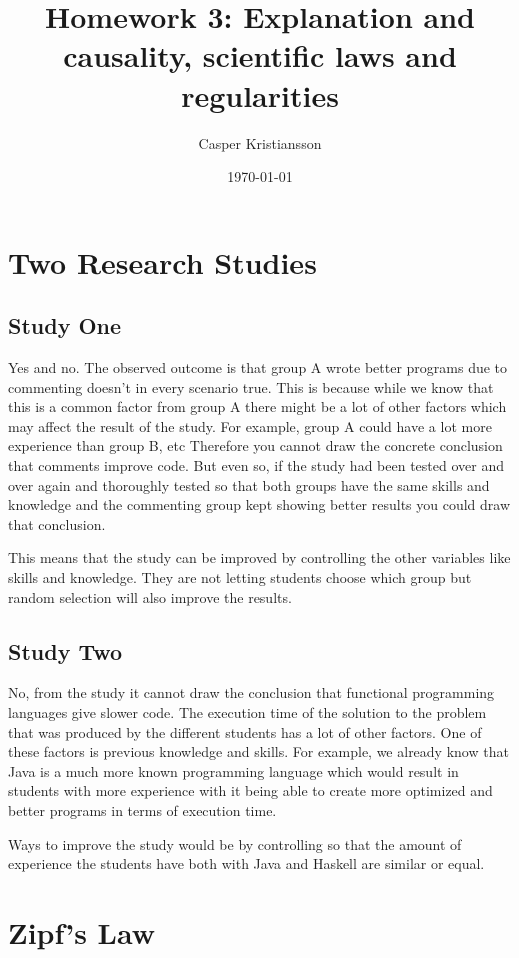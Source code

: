 \documentclass{article}
\title{Homework 3: Explanation and causality, scientific laws and regularities}
\author{Casper Kristiansson}
\date{\today}
\begin{document}
\maketitle

\section{Two Research Studies}
\subsection{Study One}
Yes and no. The observed outcome is that group A wrote better programs due to commenting doesn't in every scenario true. This is because while we know that this is a common factor from group A there might be a lot of other factors which may affect the result of the study. For example, group A could have a lot more experience than group B, etc Therefore you cannot draw the concrete conclusion that comments improve code. But even so, if the study had been tested over and over again and thoroughly tested so that both groups have the same skills and knowledge and the commenting group kept showing better results you could draw that conclusion.

This means that the study can be improved by controlling the other variables like skills and knowledge. They are not letting students choose which group but random selection will also improve the results.

\subsection{Study Two}
No, from the study it cannot draw the conclusion that functional programming languages give slower code. The execution time of the solution to the problem that was produced by the different students has a lot of other factors. One of these factors is previous knowledge and skills. For example, we already know that Java is a much more known programming language which would result in students with more experience with it being able to create more optimized and better programs in terms of execution time.

Ways to improve the study would be by controlling so that the amount of experience the students have both with Java and Haskell are similar or equal.

\section{Zipf's Law}
\end{document}
